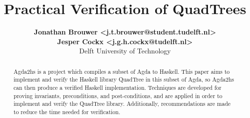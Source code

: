 \documentclass[english]{article}
\begin{document}
\title{\textbf{Practical Verification of QuadTrees}}
\author{
	\textbf{Jonathan Brouwer <j.t.brouwer@student.tudelft.nl>} \\ 
	\textbf{Jesper Cockx <j.g.h.cockx@tudelft.nl>} \\ 
	Delft University of Technology
}
\maketitle

\begin{abstract}
Agda2hs is a project which compiles a subset of Agda to Haskell. This paper aims to implement and verify the Haskell library QuadTree in this subset of Agda, so Agda2hs can then produce a verified Haskell implementation. Techniques are developed for proving invariants, preconditions, and post-conditions, and are applied in order to implement and verify the QuadTree library. Additionally, recommendations are made to reduce the time needed for verification.
\end{abstract}











\end{document}
